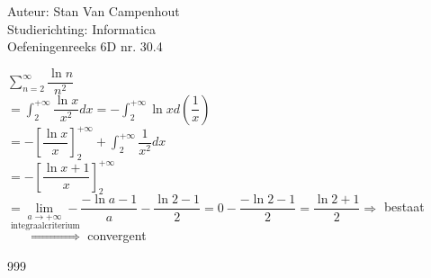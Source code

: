 \documentclass[a4paper]{article}
\begin{document}
  
\noindent \large Auteur: Stan Van Campenhout \\
\noindent \large Studierichting:  Informatica\\
\noindent \large Oefeningenreeks 6D nr. 30.4\\

\medskip

\normalsize

$ \displaystyle\sum\limits_{n = 2}^\infty \dfrac{\ln n}{n^2} $\\

$ = \displaystyle\int_2^{+\infty}\dfrac{\ln x}{x^2}dx = -\displaystyle\int_2^{+\infty}\ln xd\left(\dfrac{1}{x}\right) $\\

$ = -\left[\dfrac{\ln x}{x}\right]_2^{+\infty} + \displaystyle\int_2^{+\infty}\dfrac{1}{x^2}dx $\\

$ = -\left[\dfrac{\ln x + 1}{x}\right]_2^{+\infty} $\\

$ = \lim\limits_{a \rightarrow +\infty} - \dfrac{-\ln a - 1}{a} - \dfrac{\ln 2 - 1}{2} = 0  - \dfrac{-\ln 2 - 1}{2} =  \dfrac{\ln 2 + 1}{2} \Rightarrow $ bestaat \\

$ \stackrel{\text{integraalcriterium}}{\Rightarrow} $ convergent \\

\begin{thebibliography}{999}
\end{thebibliography}
\end{document}
